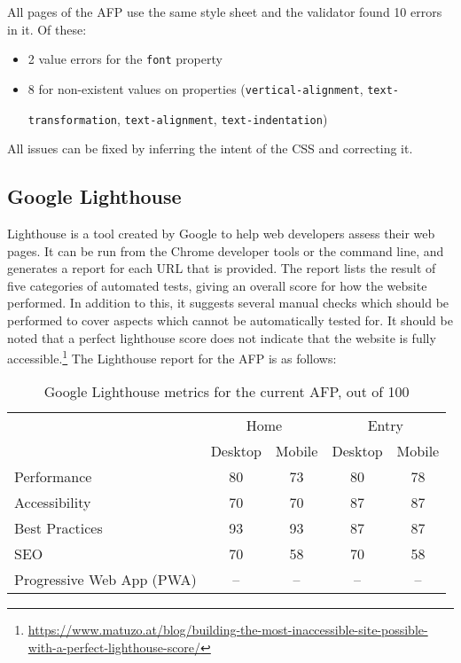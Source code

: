 \documentclass[bsc,frontabs,oneside,singlespacing,parskip,deptreport,logo]{infthesis}
\begin{document}
All pages of the AFP use the same style sheet and the validator found 10 errors in it. Of these:

\begin{itemize}
    \item 2 value errors for the \verb|font| property
    \item 8 for non-existent values on properties (\verb|vertical-alignment|, \verb|text-|
    
    \verb|transformation|, \verb|text-alignment|, \verb|text-indentation|)
\end{itemize}

All issues can be fixed by inferring the intent of the CSS and correcting it.

\subsection{Google Lighthouse}

Lighthouse \cite{lighthouse} is a tool created by Google to help web developers assess their web pages. It can be run from the Chrome developer tools or the command line, and generates a report for each URL that is provided. The report lists the result of five categories of automated tests, giving an overall score for how the website performed. In addition to this, it suggests several manual checks which should be performed to cover aspects which cannot be automatically tested for. It should be noted that a perfect lighthouse score does not indicate that the website is fully accessible.\footnote{\url{https://www.matuzo.at/blog/building-the-most-inaccessible-site-possible-with-a-perfect-lighthouse-score/}} 
The Lighthouse report for the AFP is as follows:

\begin{table}[h]
\centering
{}
\begin{tabularx}{0.5\textwidth}{lcccc}
                          & \multicolumn{2}{c}{Home} & \multicolumn{2}{c}{Entry} \\
                          & Desktop     & Mobile     & Desktop      & Mobile     \\
Performance               & 80          & 73         & 80           & 78         \\
Accessibility             & 70          & 70         & 87           & 87         \\
Best Practices            & 93          & 93         & 87           & 87         \\
SEO                       & 70          & 58         & 70           & 58         \\
Progressive Web App (PWA) & --          & --         & --           & --        
\end{tabularx}
\caption{Google Lighthouse metrics for the current AFP, out of 100}
\end{table}
\end{document}
